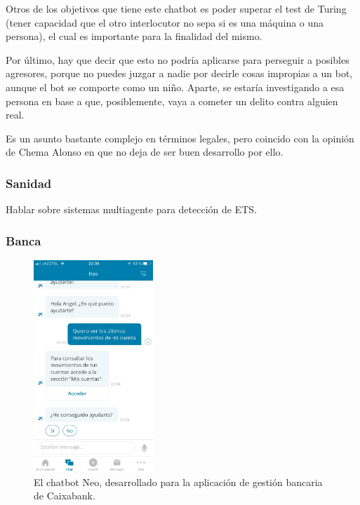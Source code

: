 \documentclass[spanish,12pt, a4paper, twoside]{paper}
\begin{document}
Otros de los objetivos que tiene este chatbot es poder superar el test de Turing (tener capacidad que el otro interlocutor no sepa si es una máquina o una persona), el cual es importante para la finalidad del mismo.
\newline

Por último, hay que decir que esto no podría aplicarse para perseguir a posibles agresores, porque no puedes juzgar a nadie por decirle cosas impropias a un bot, aunque el bot se comporte como un niño. Aparte, se estaría investigando a esa persona en base a que, posiblemente, vaya a cometer un delito contra alguien real.

Es un asunto bastante complejo en términos legales, pero coincido con la opinión de Chema Alonso en que no deja de ser buen desarrollo por ello.

\subsubsection{Sanidad}

Hablar sobre sistemas multiagente para detección de ETS.

\subsubsection{Banca}

\begin{figure}
\centering
	\includegraphics[width=0.4\textwidth]{recursos/neoCaixabank}
\caption{El chatbot Neo, desarrollado para la aplicación de gestión bancaria de Caixabank.}
\label{fig:Neo, bot de CaixaBank}
\end{figure}
\end{document}
